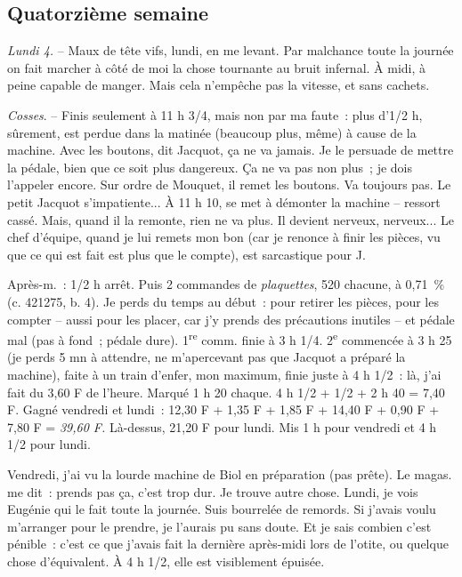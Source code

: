 \documentclass[french,twoside]{book} %
\begin{document}
\subsection[Quatorzième semaine]{Quatorzième semaine}
\noindent \par
{\itshape Lundi 4.} – Maux de tête vifs, lundi, en me levant. Par malchance toute la journée on fait marcher à côté de moi la chose tournante au bruit infernal. À midi, à peine capable de manger. Mais cela n'empêche pas la vitesse, et sans cachets.\par
{\itshape Cosses}. – Finis seulement à 11 h 3/4, mais non par ma faute : plus d'1/2 h, sûrement, est perdue dans la matinée (beaucoup plus, même) à cause de la machine. Avec les boutons, dit Jacquot, ça ne va jamais. Je le persuade de mettre la pédale, bien que ce soit plus dangereux. Ça ne va pas non plus ; je dois l'appeler encore. Sur ordre de Mouquet, il remet les boutons. Va toujours pas. Le petit Jacquot s'impatiente... À 11 h 10, se met à démonter la machine – ressort cassé. Mais, quand il la remonte, rien ne va plus. Il devient nerveux, nerveux... Le chef d'équipe, quand je lui remets mon bon (car je renonce à finir les pièces, vu que ce qui est fait est plus que le compte), est sarcastique pour J.\par
Après-m. : 1/2 h arrêt. Puis 2 commandes de {\itshape plaquettes}, 520 chacune, à 0,71 \% (c. 421275, b. 4). Je perds du temps au début : pour retirer les pièces, pour les compter – aussi pour les placer, car j'y prends des précautions inutiles – et pédale mal (pas à fond ; pédale dure). 1\textsuperscript{re} comm. finie à 3 h 1/4. 2\textsuperscript{e} commencée à 3 h 25 (je perds 5 mn à attendre, ne m'apercevant pas que Jacquot a préparé la machine), faite à un train d'enfer, mon maximum, finie juste à 4 h 1/2 : là, j'ai fait du 3,60 F de l'heure. Marqué 1 h 20 chaque. 4 h 1/2 + 1/2 + 2 h 40 = 7,40 F. Gagné vendredi et lundi : 12,30 F + 1,35 F + 1,85 F + 14,40 F + 0,90 F + 7,80 F = {\itshape 39,60 F.} Là-dessus, 21,20 F pour lundi. Mis 1 h pour vendredi et 4 h 1/2 pour lundi.\par
Vendredi, j'ai vu la lourde machine de Biol en préparation (pas prête). Le magas. me dit : prends pas ça, c'est trop dur. Je trouve autre chose. Lundi, je vois Eugénie qui le fait toute la journée. Suis bourrelée de remords. Si j'avais voulu m'arranger pour le prendre, je l'aurais pu sans doute. Et je sais combien c'est pénible : c'est ce que j'avais fait la dernière après-midi lors de l'otite, ou quelque chose d'équivalent. À 4 h 1/2, elle est visiblement épuisée.\par
\end{document}

